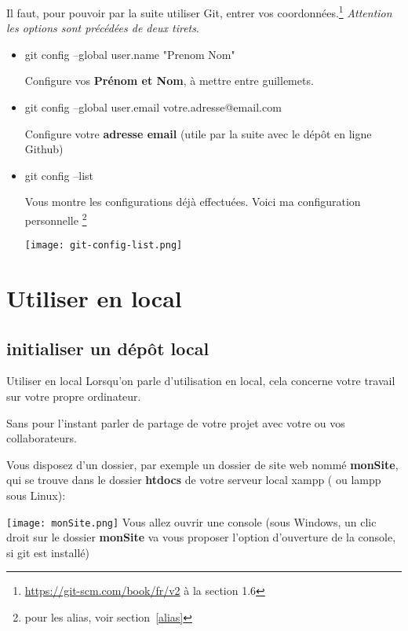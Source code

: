 \documentclass[10pt]{beamer}
\begin{document}
\begin{frame}{}
Il faut, pour pouvoir par la suite utiliser Git, entrer vos coordonnées.\footnote{\url{https://git-scm.com/book/fr/v2} à la section 1.6} \textit{Attention les options sont précédées de deux tirets}.

\begin{itemize}
\item  git config --global user.name "Prenom Nom"

Configure vos \textbf{Prénom et Nom}, à mettre entre guillemets.

\item  git config --global user.email votre.adresse@email.com

Configure votre \textbf{adresse email} (utile par la suite avec le dépôt en ligne Github)

\item git config --list

Vous montre les configurations déjà effectuées. Voici ma configuration personnelle
\footnote{pour les alias, voir section~\ref{alias}}

\texttt{[image: git-config-list.png]}

\end{itemize}




\end{frame}



\section{Utiliser en local}

\subsection{initialiser un dépôt local}

\begin{frame}{Utiliser en local}
Lorsqu'on parle d'utilisation en local, cela concerne votre travail sur votre propre ordinateur.

Sans pour l'instant parler de partage de votre projet avec votre ou vos collaborateurs.

Vous disposez d'un dossier, par exemple un dossier de site web nommé \textbf{monSite}, qui se trouve dans le dossier \textbf{htdocs} de votre serveur local xampp ( ou lampp sous Linux):

\texttt{[image: monSite.png]}
Vous allez ouvrir une console (sous Windows, un clic droit sur le dossier \textbf{monSite} va vous proposer l'option d'ouverture de la console, si git est installé)
\end{frame}
\end{document}
